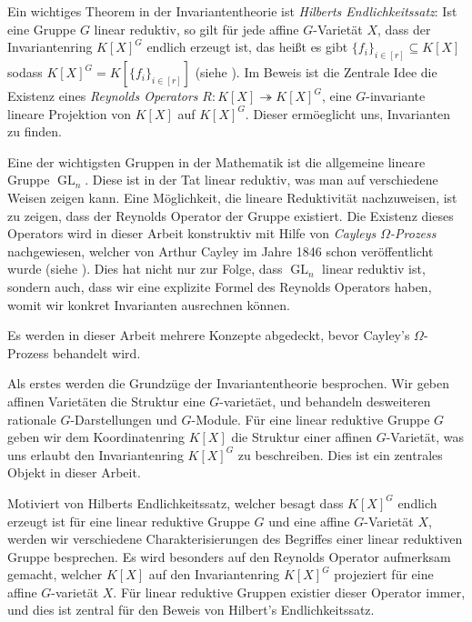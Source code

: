 Ein wichtiges Theorem in der Invariantentheorie ist \textit{Hilberts Endlichkeitssatz}:  Ist eine Gruppe $G$ linear reduktiv, so gilt f\"ur jede affine $G$-Variet\"at $X$, dass der Invariantenring $K[X]^G$ endlich erzeugt ist, das hei{\ss}t es gibt $\{f_i\}_{i\in[r]} \subseteq K[X]$ sodass $K[X]^G = K[\{f_i\}_{i\in[r]}]$ (siehe \cite{Hil90}).
Im Beweis ist die Zentrale Idee die Existenz eines \textit{Reynolds Operators} $R \colon K[X] \twoheadrightarrow K[X]^G$, eine $G$-invariante lineare Projektion von $K[X]$ auf $K[X]^G$.
Dieser erm\"oeglicht uns, Invarianten zu finden.

Eine der wichtigsten Gruppen in der Mathematik ist die allgemeine lineare Gruppe $\operatorname{GL}_n$.
Diese ist in der Tat linear reduktiv, was man auf verschiedene Weisen zeigen kann.
Eine M\"oglichkeit, die lineare Reduktivit\"at nachzuweisen, ist zu zeigen, dass der Reynolds Operator der Gruppe existiert.
Die Existenz dieses Operators wird in dieser Arbeit konstruktiv mit Hilfe von \textit{Cayleys $\Omega$-Prozess} nachgewiesen, welcher von Arthur Cayley im Jahre 1846 schon ver\"offentlicht wurde (siehe \cite{Cay46}).
Dies hat nicht nur zur Folge, dass $\operatorname{GL}_n$ linear reduktiv ist, sondern auch, dass wir eine explizite Formel des Reynolds Operators haben, womit wir konkret Invarianten ausrechnen k\"onnen.

Es werden in dieser Arbeit mehrere Konzepte abgedeckt, bevor Cayley's $\Omega$-Prozess behandelt wird.

Als erstes werden die Grundz\"uge der Invariantentheorie besprochen.
Wir geben affinen Variet\"aten die Struktur eine $G$-variet\"aet, und behandeln desweiteren rationale $G$-Darstellungen und $G$-Module.
F\"ur eine linear reduktive Gruppe $G$ geben wir dem Koordinatenring $K[X]$ die Struktur einer affinen $G$-Variet\"at, was uns erlaubt den Invariantenring $K[X]^G$ zu beschreiben.
Dies ist ein zentrales Objekt in dieser Arbeit.

Motiviert von Hilberts Endlichkeitssatz, welcher besagt dass $K[X]^G$ endlich erzeugt ist f\"ur eine linear reduktive Gruppe $G$ und eine affine $G$-Variet\"at $X$, werden wir verschiedene Charakterisierungen des Begriffes einer linear reduktiven Gruppe besprechen.
Es wird besonders auf den Reynolds Operator aufmerksam gemacht, welcher $K[X]$ auf den Invariantenring $K[X]^G$ projeziert f\"ur eine affine $G$-variet\"at $X$.
F\"ur linear reduktive Gruppen existier dieser Operator immer, und dies ist zentral f\"ur den Beweis von Hilbert's Endlichkeitssatz.

